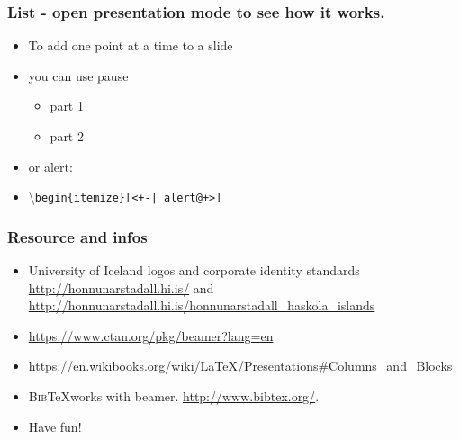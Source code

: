\documentclass[hi-blar]{beamer}
\begin{document}
\begin{frame}
\frametitle{List - open presentation mode to see how it works.}
\begin{itemize}
\pause
\item To add one point at a time to a slide
\pause
\item you can use pause
\begin{itemize}
\pause
\item part 1
\pause
\item part 2
\end{itemize}
\pause
\item or alert:
\pause
\item \textbackslash\texttt{begin\{itemize\}[<+-| alert@+>]}
\end{itemize}
\end{frame}


\begin{frame}
  \frametitle{Resource and infos}
  \begin{itemize}
\item University of Iceland logos and corporate identity standards \url{http://honnunarstadall.hi.is/} and \url{http://honnunarstadall.hi.is/honnunarstadall_haskola_islands}
\item \url{https://www.ctan.org/pkg/beamer?lang=en}
\item \url{https://en.wikibooks.org/wiki/LaTeX/Presentations\#Columns_and_Blocks}
\item \textsc{Bib}\TeX works with beamer. \url{http://www.bibtex.org/}.
\item Have fun!
  \end{itemize}
\end{frame}




 
\end{document}
